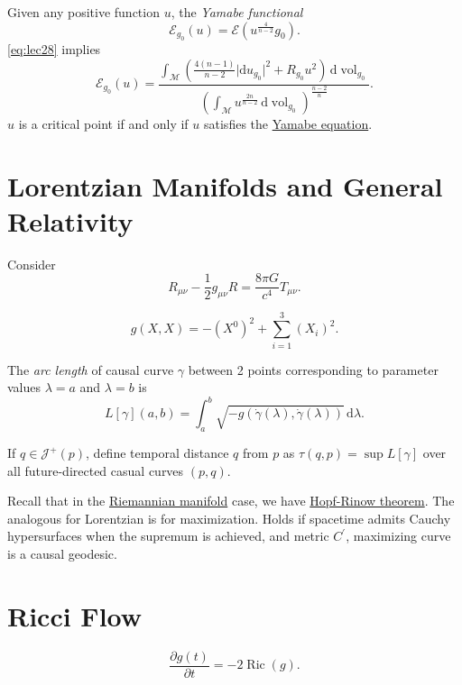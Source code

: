 Given any positive function \(u\), the \emph{Yamabe functional}
\[
	\mathcal{E} _{g_0}(u) = \mathcal{E} (u^{\frac{4}{n-2}} g_0).
\]
\autoref{eq:lec28} implies
\[
	\mathcal{E} _{g_0}(u) = \frac{\int _\mathcal{M} \left( \frac{4(n-1)}{n-2}\vert \mathrm{d} u_{g_0} \vert ^2 + R_{g_0}u^2 \right) \,\mathrm{d} \mathop{\mathrm{vol}}_{g_0} }{\left( \int _\mathcal{M} u^{\frac{2n}{n-2}} \,\mathrm{d} \mathop{\mathrm{vol}}_{g_0} \right) ^{\frac{n-2}{n}}}.
\]
\(u\) is a critical point if and only if \(u\) satisfies the \hyperref[eq:Yamabe]{Yamabe equation}.

\section{Lorentzian Manifolds and General Relativity}
Consider
\[
	R_{\mu \nu } - \frac{1}{2}g_{\mu \nu } R = \frac{8 \pi G}{c^4} T_{\mu \nu }.
\]

\[
	g(X, X) = -(X^0)^2 + \sum_{i=1}^3 (X_i)^2.
\]

\begin{definition}
	The \emph{arc length} of causal curve \(\gamma \) between 2 points corresponding to parameter values \(\lambda = a\) and \(\lambda = b\) is
	\[
		L[\gamma ](a, b) = \int_{a}^{b} \sqrt{-g(\dot{\gamma }(\lambda ), \dot{\gamma }(\lambda )  )} \,\mathrm{d}\lambda .
	\]
\end{definition}

If \(q\in \mathcal{J} ^+(p)\), define temporal distance \(q\) from \(p\) as \(\tau (q, p) = \sup L[\gamma ]\) over  all future-directed casual curves \((p, q)\).

Recall that in the \hyperref[def:Riemannian-manifold]{Riemannian manifold} case, we have \hyperref[thm:Hopf-Rinow]{Hopf-Rinow theorem}. The analogous for Lorentzian is for maximization. Holds if spacetime admits Cauchy hypersurfaces when the supremum is achieved, and metric \(C^{\prime} \), maximizing curve is a causal geodesic.

\section{Ricci Flow}
\[
	\frac{\partial g(t)}{\partial t} = -2 \mathop{\mathrm{Ric}}(g) .
\]